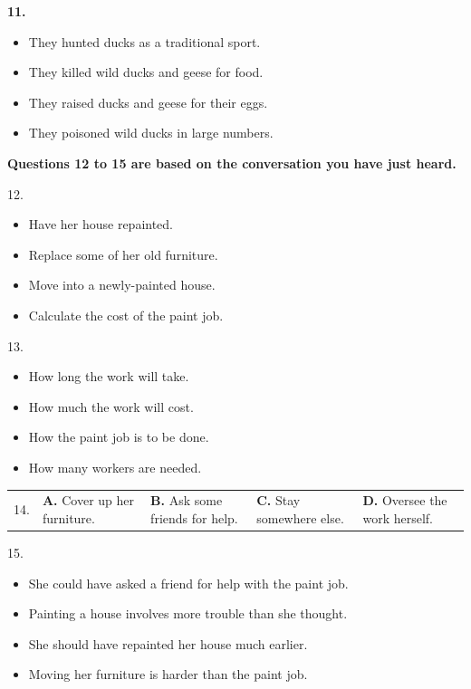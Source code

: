 \documentclass[UTF8,11pt]{ctexart}
\begin{document}
\textbf{11.}


\begin{itemize}[leftmargin=2em,itemsep=.2em,topsep=.4em]\item[A.] They hunted ducks as a traditional sport.
\item[B.] They killed wild ducks and geese for food.
\item[C.] They raised ducks and geese for their eggs.
\item[D.] They poisoned wild ducks in large numbers.
\end{itemize}

\textbf{Questions 12 to 15 are based on the conversation you have just heard.}


12.


\begin{itemize}[leftmargin=2em,itemsep=.2em,topsep=.4em]\item[A.] Have her house repainted.
\item[B.] Replace some of her old furniture.
\item[C.] Move into a newly-painted house.
\item[D.] Calculate the cost of the paint job.
\end{itemize}

13.


\begin{itemize}[leftmargin=2em,itemsep=.2em,topsep=.4em]\item[A.] How long the work will take.
\item[B.] How much the work will cost.
\item[C.] How the paint job is to be done.
\item[D.] How many workers are needed.
\end{itemize}

\noindent\begin{tabularx}{\linewidth}{@{}lXXXX@{}}14. & \textbf{A.} Cover up her furniture. & \textbf{B.} Ask some friends for help. & \textbf{C.} Stay somewhere else. & \textbf{D.} Oversee the work herself.\\\end{tabularx}\par

15.


\begin{itemize}[leftmargin=2em,itemsep=.2em,topsep=.4em]\item[A.] She could have asked a friend for help with the paint job.
\item[B.] Painting a house involves more trouble than she thought.
\item[C.] She should have repainted her house much earlier.
\item[D.] Moving her furniture is harder than the paint job.
\end{itemize}
\end{document}
